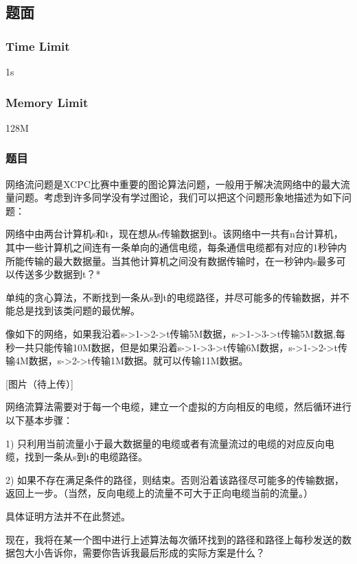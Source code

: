 \subsection{题面}

\subsubsection{Time Limit}
1s

\subsubsection{Memory Limit}
128M

\subsubsection{题目}
网络流问题是XCPC比赛中重要的图论算法问题，一般用于解决流网络中的最大流量问题。考虑到许多同学没有学过图论，我们可以把这个问题形象地描述为如下问题：

网络中由两台计算机s和t，现在想从s传输数据到t。该网络中一共有n台计算机，其中一些计算机之间连有一条单向的通信电缆，每条通信电缆都有对应的1秒钟内所能传输的最大数据量。当其他计算机之间没有数据传输时，在一秒钟内s最多可以传送多少数据到t？*

单纯的贪心算法，不断找到一条从s到t的电缆路径，并尽可能多的传输数据，并不能总是找到该类问题的最优解。

像如下的网络，如果我沿着s->1->2->t传输5M数据，s->1->3->t传输5M数据,每秒一共只能传输10M数据，但是如果沿着s->1->3->t传输6M数据，s->1->2->t传输4M数据，s->2->t传输1M数据。就可以传输11M数据。

[图片（待上传）]

网络流算法需要对于每一个电缆，建立一个虚拟的方向相反的电缆，然后循环进行以下基本步骤：

1) 只利用当前流量小于最大数据量的电缆或者有流量流过的电缆的对应反向电缆，找到一条从s到t的电缆路径。

2) 如果不存在满足条件的路径，则结束。否则沿着该路径尽可能多的传输数据，返回上一步。（当然，反向电缆上的流量不可大于正向电缆当前的流量。）

具体证明方法并不在此赘述。

现在，我将在某一个图中进行上述算法每次循环找到的路径和路径上每秒发送的数据包大小告诉你，需要你告诉我最后形成的实际方案是什么？

